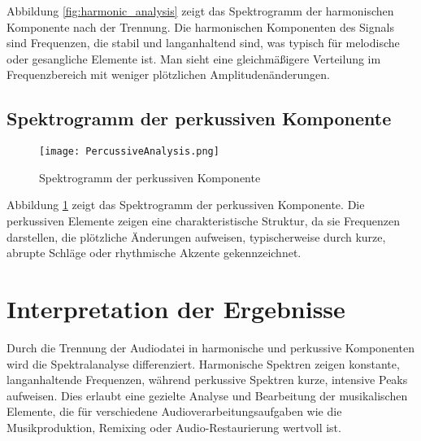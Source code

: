 Abbildung \ref{fig:harmonic_analysis} zeigt das Spektrogramm der harmonischen Komponente nach der Trennung. Die harmonischen Komponenten des Signals sind Frequenzen, die stabil und langanhaltend sind, was typisch für melodische oder gesangliche Elemente ist. Man sieht eine gleichmäßigere Verteilung im Frequenzbereich mit weniger plötzlichen Amplitudenänderungen.

\subsection{Spektrogramm der perkussiven Komponente}

\begin{figure}[H]
    \centering
    \texttt{[image: PercussiveAnalysis.png]}
    \caption{Spektrogramm der perkussiven Komponente}
    \label{fig:percussive_analysis}
\end{figure}

Abbildung \ref{fig:percussive_analysis} zeigt das Spektrogramm der perkussiven Komponente. Die perkussiven Elemente zeigen eine charakteristische Struktur, da sie Frequenzen darstellen, die plötzliche Änderungen aufweisen, typischerweise durch kurze, abrupte Schläge oder rhythmische Akzente gekennzeichnet.

\section{Interpretation der Ergebnisse}

Durch die Trennung der Audiodatei in harmonische und perkussive Komponenten wird die Spektralanalyse differenziert. Harmonische Spektren zeigen konstante, langanhaltende Frequenzen, während perkussive Spektren kurze, intensive Peaks aufweisen. Dies erlaubt eine gezielte Analyse und Bearbeitung der musikalischen Elemente, die für verschiedene Audioverarbeitungsaufgaben wie die Musikproduktion, Remixing oder Audio-Restaurierung wertvoll ist.
